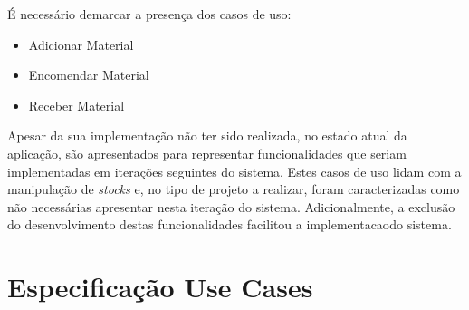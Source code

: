 \documentclass[a4paper,12pt]{scrreprt}
\begin{document}
É necessário demarcar a presença dos casos de uso:
\begin{itemize}
    \item Adicionar Material
    \item Encomendar Material
    \item Receber Material
\end{itemize}

Apesar da sua implementação não ter sido realizada, no estado atual da aplicação, são apresentados para representar funcionalidades que seriam implementadas 
em iterações seguintes do sistema.
Estes casos de uso lidam com a manipulação de \textit{stocks} e, no tipo de projeto a realizar, foram caracterizadas como não necessárias apresentar 
nesta iteração do sistema. Adicionalmente, a exclusão do desenvolvimento destas funcionalidades facilitou a implementacaodo sistema.

\section{Especificação Use Cases}

\subsection{} \label{criar_rep_expresso}


\subsection{} \label{pedir_orcamento}


\subsection{} \label{fazer_orcamento}


\subsection{} \label{criar_passo_rep}


\subsection{} \label{confirmar_orcamento}

\end{document}
